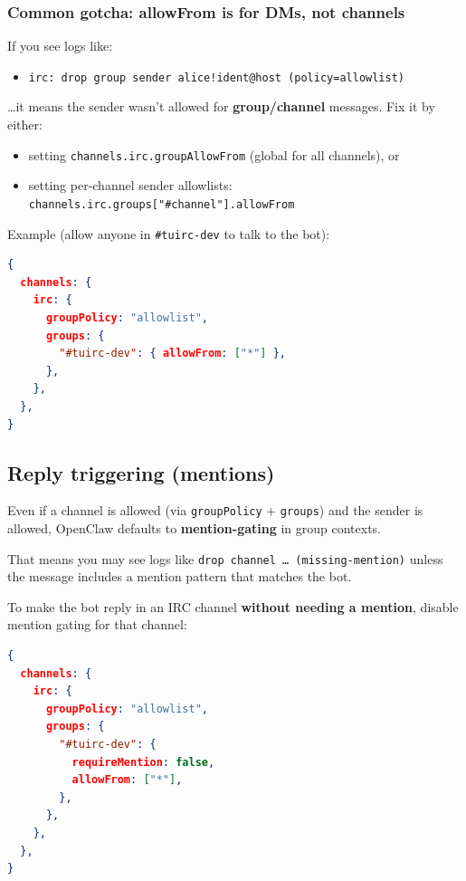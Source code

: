 \subsubsection{Common gotcha: allowFrom is for DMs, not channels}


If you see logs like:

\begin{itemize}
  \item \texttt{irc: drop group sender alice!ident@host (policy=allowlist)}
\end{itemize}


…it means the sender wasn’t allowed for \textbf{group/channel} messages. Fix it by either:

\begin{itemize}
  \item setting \texttt{channels.irc.groupAllowFrom} (global for all channels), or
  \item setting per-channel sender allowlists: \texttt{channels.irc.groups["\#channel"].allowFrom}
\end{itemize}


Example (allow anyone in \texttt{\#tuirc-dev} to talk to the bot):

\begin{lstlisting}[language=json]
{
  channels: {
    irc: {
      groupPolicy: "allowlist",
      groups: {
        "#tuirc-dev": { allowFrom: ["*"] },
      },
    },
  },
}
\end{lstlisting}


\subsection{Reply triggering (mentions)}


Even if a channel is allowed (via \texttt{groupPolicy} + \texttt{groups}) and the sender is allowed, OpenClaw defaults to \textbf{mention-gating} in group contexts.

That means you may see logs like \texttt{drop channel … (missing-mention)} unless the message includes a mention pattern that matches the bot.

To make the bot reply in an IRC channel \textbf{without needing a mention}, disable mention gating for that channel:

\begin{lstlisting}[language=json]
{
  channels: {
    irc: {
      groupPolicy: "allowlist",
      groups: {
        "#tuirc-dev": {
          requireMention: false,
          allowFrom: ["*"],
        },
      },
    },
  },
}
\end{lstlisting}


